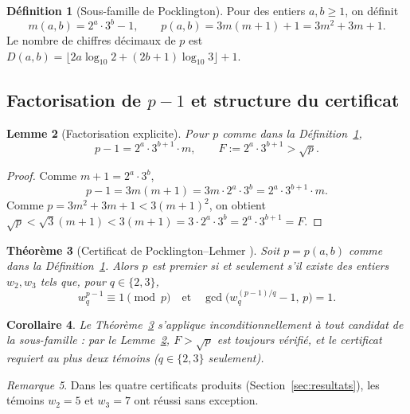 \documentclass[11pt,a4paper]{article}
\newtheorem{theoreme}{Théorème}[section]
\newtheorem{lemme}[theoreme]{Lemme}
\newtheorem{corollaire}[theoreme]{Corollaire}
\theoremstyle{definition}
\newtheorem{definition}[theoreme]{Définition}
\theoremstyle{remark}
\newtheorem{remarque}[theoreme]{Remarque}
\begin{document}
\begin{definition}[Sous-famille de Pocklington]\label{def:pocklington}
Pour des entiers $a,b\geq 1$, on définit
\[
  m(a,b) = 2^a\cdot 3^b - 1, \qquad
  p(a,b) = 3m(m+1)+1 = 3m^2+3m+1.
\]
Le nombre de chiffres décimaux de $p$ est
$D(a,b) = \lfloor 2a\log_{10}2 + (2b+1)\log_{10}3\rfloor + 1.$
\end{definition}

\subsection{Factorisation de $p-1$ et structure du certificat}

\begin{rigorousbox}
\begin{lemme}[Factorisation explicite]\label{lem:factorisation}
Pour $p$ comme dans la Définition~\ref{def:pocklington},
\[
  p - 1 = 2^a\cdot 3^{b+1}\cdot m, \qquad F := 2^a\cdot 3^{b+1} > \sqrt{p}.
\]
\end{lemme}
\end{rigorousbox}

\begin{proof}
Comme $m+1=2^a\cdot 3^b$,
\[
  p-1 = 3m(m+1) = 3m\cdot 2^a\cdot 3^b = 2^a\cdot 3^{b+1}\cdot m.
\]
Comme $p = 3m^2+3m+1 < 3(m+1)^2$, on obtient $\sqrt{p}<\sqrt{3}(m+1)
<3(m+1)= 3\cdot 2^a\cdot 3^b = 2^a\cdot 3^{b+1} = F$.
\end{proof}

\begin{rigorousbox}
\begin{theoreme}[Certificat de Pocklington--Lehmer
\cite{Pocklington1914,LehmerPSW1975}]\label{thm:Pocklington}
Soit $p = p(a,b)$ comme dans la Définition~\ref{def:pocklington}.
Alors $p$ est premier si et seulement s'il existe des entiers $w_2,w_3$
tels que, pour $q\in\{2,3\}$,
\[
  w_q^{p-1}\equiv 1\pmod{p}\quad\text{et}\quad
  \gcd\!\bigl(w_q^{(p-1)/q}-1,\,p\bigr)=1.
\]
\end{theoreme}
\end{rigorousbox}

\begin{corollaire}\label{cor:pocklington}
Le Théorème~\ref{thm:Pocklington} s'applique inconditionnellement à tout
candidat de la sous-famille : par le Lemme~\ref{lem:factorisation},
$F>\sqrt{p}$ est toujours vérifié, et le certificat requiert au plus
deux témoins ($q\in\{2,3\}$ seulement).
\end{corollaire}

\begin{remarque}
Dans les quatre certificats produits (Section~\ref{sec:resultats}),
les témoins $w_2 = 5$ et $w_3 = 7$ ont réussi sans exception.
\end{remarque}
\end{document}
